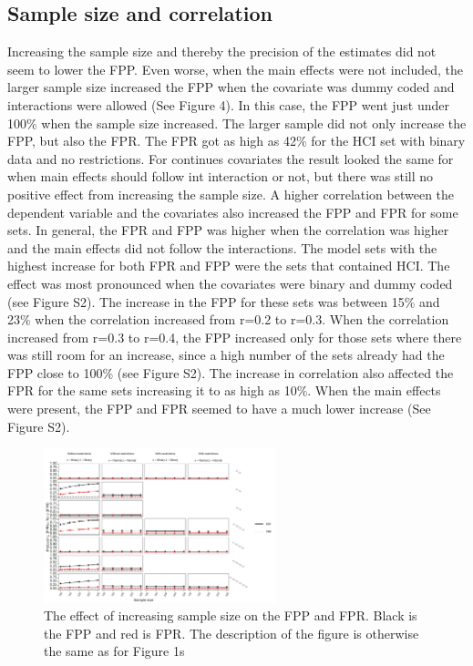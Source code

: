 \subsection{Sample size and correlation}
Increasing the sample size and thereby the precision of the estimates did not seem to lower the FPP. Even worse, when the main effects were not included, the larger sample size increased the FPP when the covariate was dummy coded and interactions were allowed (See Figure 4). In this case, the FPP went just under 100\% when the sample size increased. The larger sample did not only increase the FPP, but also the FPR. The FPR got as high as 42\% for the HCI set with binary data and no restrictions. For continues covariates the result looked the same for when main effects should follow int interaction or not, but there was still no positive effect from increasing the sample size. 
A higher correlation between the dependent variable and the covariates also increased the FPP and FPR for some sets. In general, the FPR and FPP was higher when the correlation was higher and the main effects did not follow the interactions. The model sets with the highest increase for both FPR and FPP were the sets that contained HCI. The effect was most pronounced when the covariates were binary and dummy coded (see Figure S2). The increase in the FPP for these sets was between 15\% and 23\% when the correlation increased from r=0.2 to r=0.3. When the correlation increased from r=0.3 to r=0.4, the FPP increased only for those sets where there was still room for an increase, since a high number of the sets already had the FPP close to 100\% (see Figure S2). The increase in correlation also affected the FPR for the same sets increasing it to as high as 10\%. When the main effects were present, the FPP and FPR seemed to have a much lower increase (See Figure S2).

\begin{figure}[t]
\includegraphics[width=0.6\textwidth]{R/Analysis/Result/Figures/Figure1D.jpeg}
\centering
\caption{The effect of increasing sample size on the FPP and FPR. Black is the FPP and red is FPR. The description of the figure is otherwise the same as for Figure 1s}
\label{fig:mainfigure}
\end{figure}
